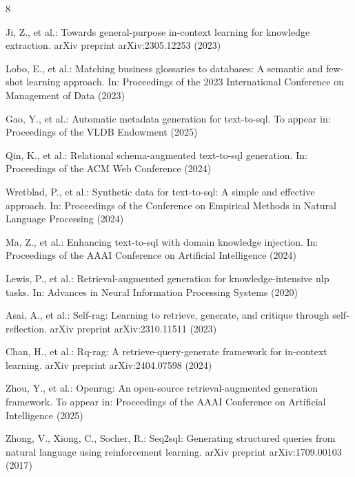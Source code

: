 \documentclass[runningheads]{llncs}
\begin{document}
%
%
%
\begin{thebibliography}{8}

Ji, Z., et al.: Towards general-purpose in-context learning for knowledge extraction. arXiv preprint arXiv:2305.12253 (2023)


Lobo, E., et al.: Matching business glossaries to databases: A semantic and few-shot learning approach. In: Proceedings of the 2023 International Conference on Management of Data (2023)

Gao, Y., et al.: Automatic metadata generation for text-to-sql. To appear in: Proceedings of the VLDB Endowment (2025)

Qin, K., et al.: Relational schema-augmented text-to-sql generation. In: Proceedings of the ACM Web Conference (2024)

Wretblad, P., et al.: Synthetic data for text-to-sql: A simple and effective approach. In: Proceedings of the Conference on Empirical Methods in Natural Language Processing (2024)

Ma, Z., et al.: Enhancing text-to-sql with domain knowledge injection. In: Proceedings of the AAAI Conference on Artificial Intelligence (2024)

Lewis, P., et al.: Retrieval-augmented generation for knowledge-intensive nlp tasks. In: Advances in Neural Information Processing Systems (2020)

Asai, A., et al.: Self-rag: Learning to retrieve, generate, and critique through self-reflection. arXiv preprint arXiv:2310.11511 (2023)

Chan, H., et al.: Rq-rag: A retrieve-query-generate framework for in-context learning. arXiv preprint arXiv:2404.07598 (2024)

Zhou, Y., et al.: Openrag: An open-source retrieval-augmented generation framework. To appear in: Proceedings of the AAAI Conference on Artificial Intelligence (2025)

Zhong, V., Xiong, C., Socher, R.: Seq2sql: Generating structured queries from natural language using reinforcement learning. arXiv preprint arXiv:1709.00103 (2017)


\end{thebibliography}
\end{document}
